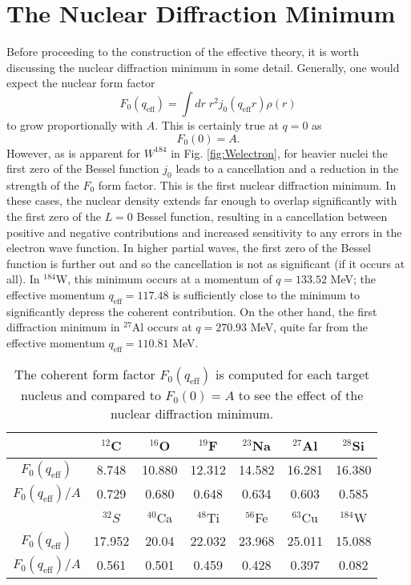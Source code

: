 \documentclass{book}[12pt]
\begin{document}
\section{The Nuclear Diffraction Minimum}
Before proceeding to the construction of the effective theory, it is worth discussing the nuclear diffraction minimum in some detail. Generally, one would expect the nuclear form factor
\begin{equation}
F_0(q_\mathrm{eff})=\int dr \;r^2j_0(q_\mathrm{eff}r)\rho(r)
\end{equation} 
to grow proportionally with $A$. This is certainly true at $q=0$ as
\begin{equation}
F_0(0) = A.
\end{equation} 
However, as is apparent for $W^{184}$ in Fig. \ref{fig:Welectron}, for heavier nuclei the first zero of the Bessel function $j_0$ leads to a cancellation and a reduction in the strength of the $F_0$ form factor. This is the first nuclear diffraction minimum. In these cases, the nuclear density extends far enough to overlap significantly with the first zero of the $L=0$ Bessel function, resulting in a cancellation between positive and negative contributions and increased sensitivity to any errors in the electron wave function. In higher partial waves, the first zero of the Bessel function is further out and so the cancellation is not as significant (if it occurs at all). In $^{184}$W, this minimum occurs at a momentum of $q=133.52$ MeV; the effective momentum $q_\mathrm{eff}=117.48$ is sufficiently close to the minimum to significantly depress the coherent contribution. On the other hand, the first diffraction minimum in $^{27}$Al occurs at $q=270.93$ MeV, quite far from the effective momentum $q_\mathrm{eff}=110.81$ MeV. 
\begin{table}
\centering
\begin{tabular}{|c|c|c|c|c|c|c|}
\hline
 & $^{12}$C & $^{16}$O & $^{19}$F & $^{23}$Na & $^{27}$Al & $^{28}$Si \\
 \hline
 $F_0(q_\mathrm{eff})$ & 8.748 & 10.880 & 12.312 & 14.582 & 16.281 & 16.380 \\
$F_0(q_\mathrm{eff})/A$ & 0.729 & 0.680 & 0.648 & 0.634 & 0.603 & 0.585\\
\hline
  & $^{32}S$ & $^{40}$Ca & $^{48}$Ti & $^{56}$Fe & $^{63}$Cu & $^{184}$W \\
\hline
 $F_0(q_\mathrm{eff})$ & 17.952 & 20.04 & 22.032 & 23.968 & 25.011 & 15.088\\
$F_0(q_\mathrm{eff})/A$  & 0.561 & 0.501 & 0.459 & 0.428 & 0.397 & 0.082\\
  \hline
\end{tabular}
\caption{The coherent form factor $F_0(q_\mathrm{eff})$ is computed for each target nucleus and compared to $F_0(0)=A$ to see the effect of the nuclear diffraction minimum.}
\end{table}
\end{document}
